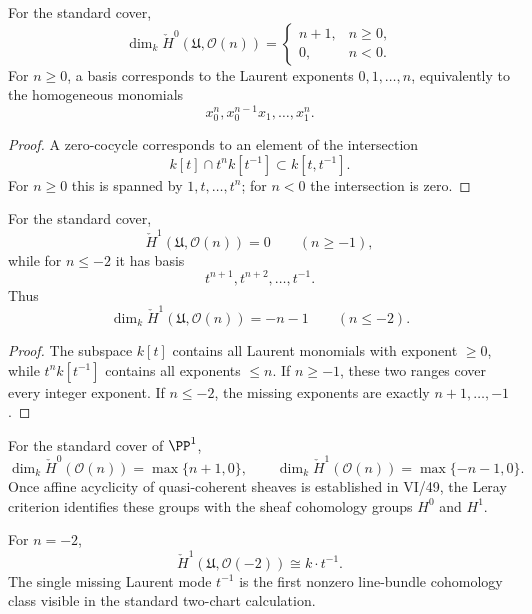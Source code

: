 \begin{theorem}\label{thm:vi47-on-h0}
For the standard cover,
\[
\dim_k\check H^0(\mathfrak U,\mathcal O(n))
=
\begin{cases}
n+1,&n\ge0,\\
0,&n<0.
\end{cases}
\]
For $n\ge0$, a basis corresponds to the Laurent exponents $0,1,\dots,n$, equivalently to the homogeneous monomials
\[
x_0^n,x_0^{n-1}x_1,\dots,x_1^n.
\]
\begin{proof}
A zero-cocycle corresponds to an element of the intersection
\[
k[t]\cap t^n k[t^{-1}]\subset k[t,t^{-1}].
\]
For $n\ge0$ this is spanned by $1,t,\dots,t^n$; for $n<0$ the intersection is zero.
\end{proof}
\end{theorem}


\begin{theorem}\label{thm:vi47-on-h1}
For the standard cover,
\[
\check H^1(\mathfrak U,\mathcal O(n))=0
\qquad(n\ge-1),
\]
while for $n\le-2$ it has basis
\[
t^{n+1},t^{n+2},\dots,t^{-1}.
\]
Thus
\[
\dim_k\check H^1(\mathfrak U,\mathcal O(n))=-n-1
\qquad(n\le-2).
\]
\begin{proof}
The subspace $k[t]$ contains all Laurent monomials with exponent $\ge0$, while $t^n k[t^{-1}]$ contains all exponents $\le n$.  If $n\ge-1$, these two ranges cover every integer exponent.  If $n\le-2$, the missing exponents are exactly $n+1,\dots,-1$.
\end{proof}
\end{theorem}

\begin{corollary}\label{cor:vi47-on-dimensions}
For the standard cover of $\PP^1$,
\[
\dim_k\check H^0(\mathcal O(n))=\max\{n+1,0\},
\qquad
\dim_k\check H^1(\mathcal O(n))=\max\{-n-1,0\}.
\]
Once affine acyclicity of quasi-coherent sheaves is established in VI/49, the Leray criterion identifies these groups with the sheaf cohomology groups $H^0$ and $H^1$.
\end{corollary}

\begin{example}\label{ex:vi47-o-minus-two}
For $n=-2$,
\[
\check H^1(\mathfrak U,\mathcal O(-2))
\cong
k\cdot t^{-1}.
\]
The single missing Laurent mode $t^{-1}$ is the first nonzero line-bundle cohomology class visible in the standard two-chart calculation.
\end{example}


